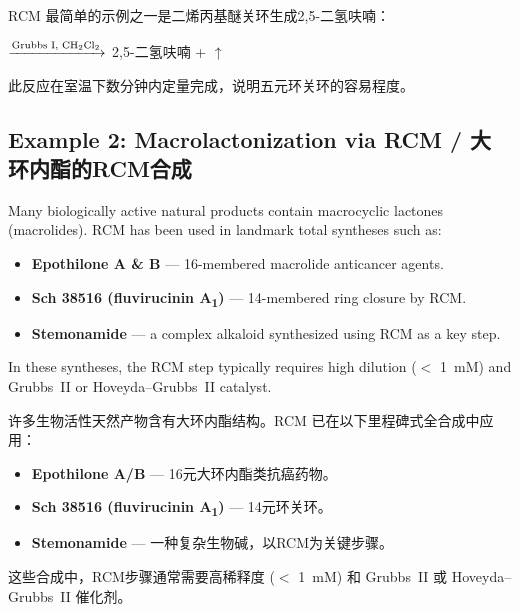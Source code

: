 \documentclass[11pt, a4paper]{article}
\begin{document}
\begin{cnbox}[中文]
RCM 最简单的示例之一是二烯丙基醚关环生成2,5-二氢呋喃：

\begin{center}
 $\xrightarrow{\text{Grubbs I, \ce{CH2Cl2}}}$
2,5-二氢呋喃 +  $\uparrow$
\end{center}

此反应在室温下数分钟内定量完成，说明五元环关环的容易程度。
\end{cnbox}

\subsection{Example 2: Macrolactonization via RCM / 大环内酯的RCM合成}

\begin{enbox}[English]
Many biologically active natural products contain macrocyclic lactones (macrolides).  RCM has been used in landmark total syntheses such as:
\begin{itemize}[nosep]
  \item \textbf{Epothilone A \& B} — 16-membered macrolide anticancer agents.
  \item \textbf{Sch 38516 (fluvirucinin A\textsubscript{1})} — 14-membered ring closure by RCM.
  \item \textbf{Stemonamide} — a complex alkaloid synthesized using RCM as a key step.
\end{itemize}
In these syntheses, the RCM step typically requires high dilution ($<$ 1~mM) and Grubbs~II or Hoveyda--Grubbs~II catalyst.
\end{enbox}

\begin{cnbox}[中文]
许多生物活性天然产物含有大环内酯结构。RCM 已在以下里程碑式全合成中应用：
\begin{itemize}[nosep]
  \item \textbf{Epothilone A/B} — 16元大环内酯类抗癌药物。
  \item \textbf{Sch 38516 (fluvirucinin A\textsubscript{1})} — 14元环关环。
  \item \textbf{Stemonamide} — 一种复杂生物碱，以RCM为关键步骤。
\end{itemize}
这些合成中，RCM步骤通常需要高稀释度 ($<$ 1~mM) 和 Grubbs~II 或 Hoveyda--Grubbs~II 催化剂。
\end{cnbox}


\end{document}
